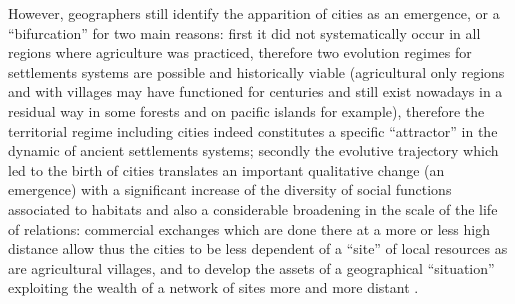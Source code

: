 \documentclass[10pt]{article}
\begin{document}
However, geographers still identify the apparition of cities as an emergence, or a ``bifurcation'' for two main reasons: first it did not systematically occur in all regions where agriculture was practiced, therefore two evolution regimes for settlements systems are possible and historically viable (agricultural only regions and with villages may have functioned for centuries and still exist nowadays in a residual way in some forests and on pacific islands for example), therefore the territorial regime including cities indeed constitutes a specific ``attractor'' in the dynamic of ancient settlements systems; secondly the evolutive trajectory which led to the birth of cities translates an important qualitative change (an emergence) with a significant increase of the diversity of social functions associated to habitats and also a considerable broadening in the scale of the life of relations: commercial exchanges which are done there at a more or less high distance allow thus the cities to be less dependent of a ``site'' of local resources as are agricultural villages, and to develop the assets of a geographical ``situation'' exploiting the wealth of a network of sites more and more distant \citep{reymond1971pour}.
\end{document}
